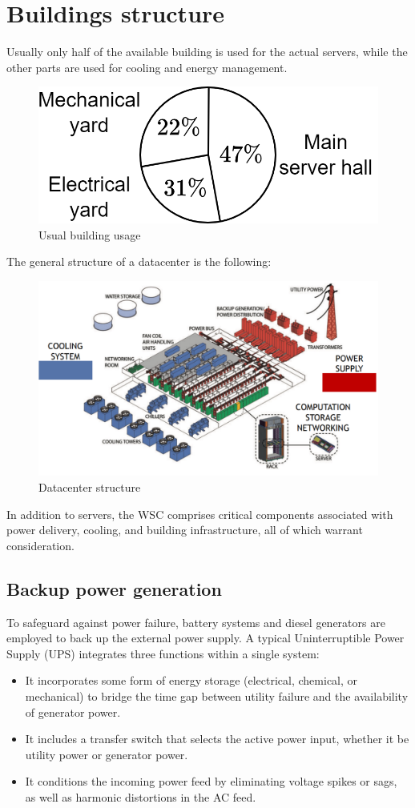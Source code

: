 \section{Buildings structure}

Usually only half of the available building is used for the actual servers, while the other parts are used for cooling and energy management. 
\begin{figure}[H]
    \centering
    \includegraphics[width=0.4\linewidth]{images/build.png}
    \caption{Usual building usage}
\end{figure}
The general structure of a datacenter is the following: 
\begin{figure}[H]
    \centering
    \includegraphics[width=0.4\linewidth]{images/struct.png}
    \caption{Datacenter structure}
\end{figure}
In addition to servers, the WSC comprises critical components associated with power delivery, cooling, and building infrastructure, all of which warrant consideration.

\subsection{Backup power generation}
To safeguard against power failure, battery systems and diesel generators are employed to back up the external power supply.
A typical Uninterruptible Power Supply (UPS) integrates three functions within a single system:
\begin{itemize}
    \item It incorporates some form of energy storage (electrical, chemical, or mechanical) to bridge the time gap between utility failure and the availability of generator power.
    \item It includes a transfer switch that selects the active power input, whether it be utility power or generator power.
    \item It conditions the incoming power feed by eliminating voltage spikes or sags, as well as harmonic distortions in the AC feed.
\end{itemize}


